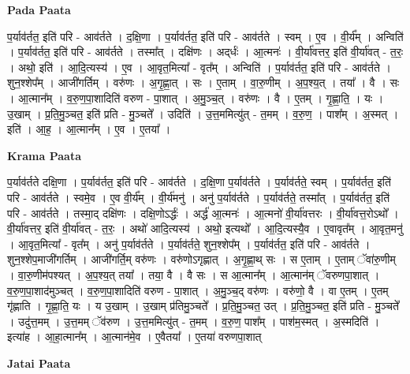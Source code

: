 \documentclass[17pt]{extarticle}
\begin{document}
\textbf{Pada Paata} \newline

प॒र्याव॑र्तत॒ इति॑ परि - आव॑र्तते । द॒क्षि॒णा । प॒र्याव॑र्तत॒ इति॑ परि - आव॑र्तते । स्वम् । ए॒व । वी॒र्य᳚म् । अन्विति॑ । प॒र्याव॑र्तत॒ इति॑ परि - आव॑र्तते । तस्मा᳚त् । दक्षि॑णः । अद्‌र्धः॑ । आ॒त्मनः॑ । वी॒र्या॑वत्तर॒ इति॑ वी॒र्या॑वत् - त॒रः॒ । अथो॒ इति॑ । आ॒दि॒त्यस्य॑ । ए॒व । आ॒वृत॒मित्या᳚ - वृत᳚म् । अन्विति॑ । प॒र्याव॑र्तत॒ इति॑ परि - आव॑र्तते । शुन॒श्शेप᳚म् । आजी॑गर्तिम् । वरु॑णः । अ॒गृ॒ह्णा॒त् । सः । ए॒ताम् । वा॒रु॒णीम् । अ॒प॒श्य॒त् । तया᳚ । वै । सः । आ॒त्मान᳚म् । व॒रु॒ण॒पा॒शादिति॑ वरुण - पा॒शात् । अ॒मु॒ञ्च॒त् । वरु॑णः । वै । ए॒तम् । गृ॒ह्णा॒ति॒ । यः । उ॒खाम् । प्र॒ति॒मु॒ञ्चत॒ इति॑ प्रति - मु॒ञ्चते᳚ । उदिति॑ । उ॒त्त॒ममित्यु॑त् - त॒मम् । व॒रु॒ण॒ । पाश᳚म् । अ॒स्मत् । इति॑ । आ॒ह॒ । आ॒त्मान᳚म् । ए॒व । ए॒तया᳚ ।  \newline


\textbf{Krama Paata} \newline

प॒र्याव॑र्तते दक्षि॒णा । प॒र्याव॑र्तत॒ इति॑ परि - आव॑र्तते । द॒क्षि॒णा प॒र्याव॑र्तते । प॒र्याव॑र्तते॒ स्वम् । प॒र्याव॑र्तत॒ इति॑ परि - आव॑र्तते । स्वमे॒व । ए॒व वी॒र्य᳚म् । वी॒र्य॑मनु॑ । अनु॑ प॒र्याव॑र्तते । प॒र्याव॑र्तते॒ तस्मा᳚त् । प॒र्याव॑र्तत॒ इति॑ परि - आव॑र्तते । तस्मा॒द् दक्षि॑णः । दक्षि॒णोऽर्द्धः॑ । अर्द्ध॑ आ॒त्मनः॑ । आ॒त्मनो॑ वी॒र्या॑वत्तरः । वी॒र्या॑वत्त॒रोऽथो᳚ । वी॒र्या॑वत्तर॒ इति॑ वी॒र्या॑वत् - त॒रः॒ । अथो॑ आदि॒त्यस्य॑ । अथो॒ इत्यथो᳚ । आ॒दि॒त्यस्यै॒व । ए॒वावृत᳚म् । आ॒वृत॒मनु॑ । आ॒वृत॒मित्या᳚ - वृत᳚म् । अनु॑ प॒र्याव॑र्तते । प॒र्याव॑र्तते॒ शुन॒श्शेप᳚म् । प॒र्याव॑र्तत॒ इति॑ परि - आव॑र्तते । शुन॒श्शेप॒माजी॑गर्तिम् । आजी॑गर्ति॒म् वरु॑णः । वरु॑णोऽगृह्णात् । अ॒गृ॒ह्णा॒थ् सः । स ए॒ताम् । ए॒ताम् ॅवा॑रु॒णीम् । वा॒रु॒णीम॑पश्यत् । अ॒प॒श्य॒त् तया᳚ । तया॒ वै । वै सः । स आ॒त्मान᳚म् । आ॒त्मान॑म् ॅवरुणपा॒शात् । व॒रु॒ण॒पा॒शाद॑मुञ्चत् । व॒रु॒ण॒पा॒शादिति॑ वरुण - पा॒शात् । अ॒मु॒ञ्च॒द् वरु॑णः । वरु॑णो॒ वै । वा ए॒तम् । ए॒तम् गृ॑ह्णाति । गृ॒ह्णा॒ति॒ यः । य उ॒खाम् । उ॒खाम् प्र॑तिमु॒ञ्चते᳚ । प्र॒ति॒मु॒ञ्चत॒ उत् । प्र॒ति॒मु॒ञ्चत॒ इति॑ प्रति - मु॒ञ्चते᳚ । उदु॑त्त॒मम् । उ॒त्त॒मम् ॅव॑रुण । उ॒त्त॒ममित्यु॑त् - त॒मम् । व॒रु॒ण॒ पाश᳚म् । पाश॑म॒स्मत् । अ॒स्मदिति॑ । इत्या॑ह । आ॒हा॒त्मान᳚म् । आ॒त्मान॑मे॒व । ए॒वैतया᳚ । ए॒तया॑ वरुणपा॒शात् \newline

\textbf{Jatai Paata} \newline
\end{document}

